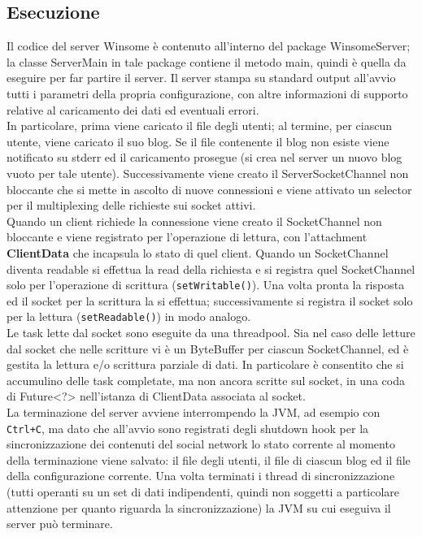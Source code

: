 \subsection{Esecuzione}
Il codice del server Winsome è contenuto all'interno del package WinsomeServer; la classe ServerMain in tale package contiene il metodo main, quindi è quella da eseguire per far partire il server. Il server stampa su standard output all'avvio tutti i parametri della propria configurazione, con altre informazioni di supporto relative al caricamento
dei dati ed eventuali errori.\\
In particolare, prima viene caricato il file degli utenti; al termine, per ciascun utente, viene caricato il suo blog. Se il file contenente il blog 
non esiste viene notificato su stderr ed il caricamento prosegue (si crea nel server un nuovo blog vuoto per tale utente). Successivamente viene creato il ServerSocketChannel
non bloccante che si mette in ascolto di nuove connessioni e viene attivato un selector per il multiplexing delle richieste sui socket attivi.\\
Quando un client richiede la connessione viene creato il SocketChannel non bloccante e viene registrato per l'operazione di lettura, con l'attachment \textbf{ClientData} che incapsula lo stato di quel client. Quando un SocketChannel diventa readable si effettua la read della richiesta e si registra quel SocketChannel solo per l'operazione di scrittura (\verb|setWritable()|). Una volta pronta la risposta ed il socket per la scrittura la si effettua; successivamente si registra il socket solo per la lettura (\verb|setReadable()|) in modo analogo.\\
Le task lette dal socket sono eseguite da una threadpool. Sia nel caso delle letture dal socket che nelle scritture vi è un ByteBuffer per ciascun SocketChannel, ed è gestita
la lettura e/o scrittura parziale di dati. In particolare è consentito che si accumulino delle task completate, ma non ancora scritte sul socket, in una coda di Future<?> 
nell'istanza di ClientData associata al socket.\\
La terminazione del server avviene interrompendo la JVM, ad esempio con \verb|Ctrl+C|, ma  dato che all'avvio sono registrati degli shutdown hook per la sincronizzazione dei contenuti del social network lo stato corrente al momento della terminazione viene salvato: il file degli utenti, il file di ciascun blog ed il file della configurazione corrente. Una volta terminati i thread di sincronizzazione (tutti operanti su un set di dati indipendenti, quindi non soggetti a particolare attenzione per quanto riguarda la sincronizzazione) la JVM su cui eseguiva il server può terminare.
